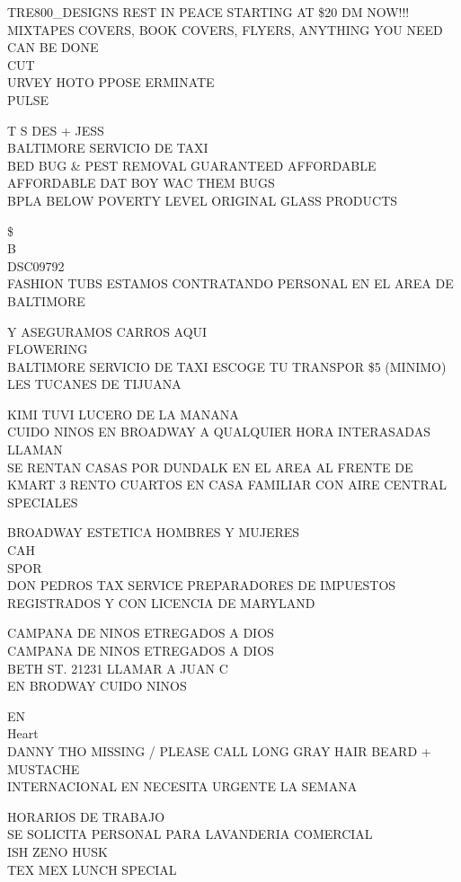 \documentclass[10pt,letterpaper]{article}
\begin{document}
TRE800\_DESIGNS REST IN PEACE STARTING AT \$20 DM NOW!!! MIXTAPES COVERS, BOOK COVERS, FLYERS, ANYTHING YOU NEED CAN BE DONE\\
CUT\\
URVEY HOTO PPOSE ERMINATE\\
PULSE

T S DES + JESS\\
BALTIMORE SERVICIO DE TAXI\\
BED BUG \& PEST REMOVAL GUARANTEED AFFORDABLE AFFORDABLE DAT BOY WAC THEM BUGS\\
BPLA BELOW POVERTY LEVEL ORIGINAL GLASS PRODUCTS

\$\\
B\\
DSC09792\\
FASHION TUBS ESTAMOS CONTRATANDO PERSONAL EN EL AREA DE BALTIMORE

Y ASEGURAMOS CARROS AQUI\\
FLOWERING\\
BALTIMORE SERVICIO DE TAXI ESCOGE TU TRANSPOR \$5 (MINIMO)\\
LES TUCANES DE TIJUANA

KIMI TUVI LUCERO DE LA MANANA\\
CUIDO NINOS EN BROADWAY A QUALQUIER HORA INTERASADAS LLAMAN\\
SE RENTAN CASAS POR DUNDALK EN EL AREA AL FRENTE DE KMART 3 RENTO CUARTOS EN CASA FAMILIAR CON AIRE CENTRAL\\
SPECIALES

BROADWAY ESTETICA HOMBRES Y MUJERES\\
CAH\\
SPOR\\
DON PEDROS TAX SERVICE PREPARADORES DE IMPUESTOS REGISTRADOS Y CON LICENCIA DE MARYLAND

CAMPANA DE NINOS ETREGADOS A DIOS\\
CAMPANA DE NINOS ETREGADOS A DIOS\\
BETH ST. 21231 LLAMAR A JUAN C\\
EN BRODWAY CUIDO NINOS

EN\\
Heart\\
DANNY THO MISSING / PLEASE CALL LONG GRAY HAIR BEARD + MUSTACHE\\
INTERNACIONAL EN NECESITA URGENTE LA SEMANA

HORARIOS DE TRABAJO\\
SE SOLICITA PERSONAL PARA LAVANDERIA COMERCIAL\\
ISH ZENO HUSK\\
TEX MEX LUNCH SPECIAL
\end{document}
